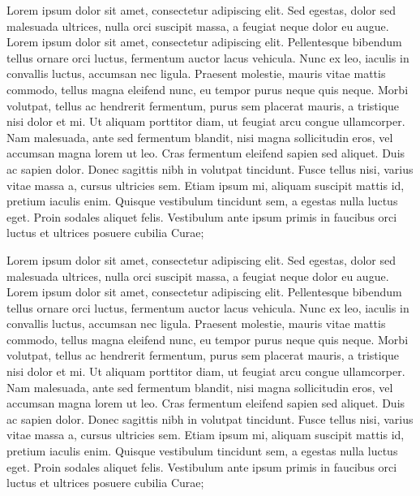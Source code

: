 \documentclass{article}
\begin{document}
\begin{pairs}
\begin{Leftside}
        \pstart
Lorem ipsum dolor sit amet, consectetur adipiscing elit. Sed egestas, dolor sed malesuada ultrices, nulla orci suscipit massa, a feugiat neque dolor eu augue. Lorem ipsum dolor sit amet, consectetur adipiscing elit. Pellentesque bibendum tellus ornare orci luctus, fermentum auctor lacus vehicula. Nunc ex leo, iaculis in convallis luctus, accumsan nec ligula. Praesent molestie, mauris vitae mattis commodo, tellus magna eleifend nunc, eu tempor purus neque quis neque. Morbi volutpat, tellus ac hendrerit fermentum, purus sem placerat mauris, a tristique nisi dolor et mi. Ut aliquam porttitor diam, ut feugiat arcu congue ullamcorper. Nam malesuada, ante sed fermentum blandit, nisi magna sollicitudin eros, vel accumsan magna lorem ut leo. Cras fermentum eleifend sapien sed aliquet. Duis ac sapien dolor. Donec sagittis nibh in volutpat tincidunt. Fusce tellus nisi, varius vitae massa a, cursus ultricies sem. Etiam ipsum mi, aliquam suscipit mattis id, pretium iaculis enim. Quisque vestibulum tincidunt sem, a egestas nulla luctus eget. Proin sodales aliquet felis. Vestibulum ante ipsum primis in faucibus orci luctus et ultrices posuere cubilia Curae;
\pend
  \end{Leftside}

\begin{Rightside}
    \beginnumbering

   \pstart
Lorem ipsum dolor sit amet, consectetur adipiscing elit. Sed egestas, dolor sed malesuada ultrices, nulla orci suscipit massa, a feugiat neque dolor eu augue. Lorem ipsum dolor sit amet, consectetur adipiscing elit. Pellentesque bibendum tellus ornare orci luctus, fermentum auctor lacus vehicula. Nunc ex leo, iaculis in convallis luctus, accumsan nec ligula. Praesent molestie, mauris vitae mattis commodo, tellus magna eleifend nunc, eu tempor purus neque quis neque. Morbi volutpat, tellus ac hendrerit fermentum, purus sem placerat mauris, a tristique nisi dolor et mi. Ut aliquam porttitor diam, ut feugiat arcu congue ullamcorper. Nam malesuada, ante sed fermentum blandit, nisi magna sollicitudin eros, vel accumsan magna lorem ut leo. Cras fermentum eleifend sapien sed aliquet. Duis ac sapien dolor. Donec sagittis nibh in volutpat tincidunt. Fusce tellus nisi, varius vitae massa a, cursus ultricies sem. Etiam ipsum mi, aliquam suscipit mattis id, pretium iaculis enim. Quisque vestibulum tincidunt sem, a egestas nulla luctus eget. Proin sodales aliquet felis. Vestibulum ante ipsum primis in faucibus orci luctus et ultrices posuere cubilia Curae;


\end{Rightside}
\end{pairs}
\end{document}
